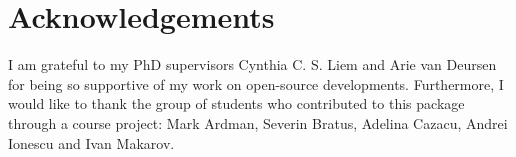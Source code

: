 \documentclass{juliacon}
\begin{document}
\section{Acknowledgements}\label{sec-ack}

I am grateful to my PhD supervisors Cynthia C. S. Liem and Arie van
Deursen for being so supportive of my work on open-source developments.
Furthermore, I would like to thank the group of students who contributed
to this package through a course project: Mark Ardman, Severin Bratus,
Adelina Cazacu, Andrei Ionescu and Ivan Makarov.


\printbibliography
\end{document}
